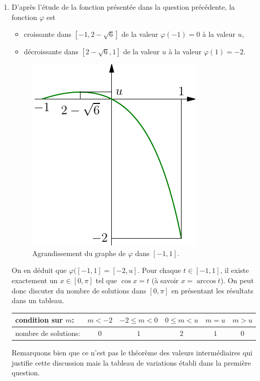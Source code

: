 \begin{enumerate}
  \item D'après l'étude de la fonction présentée dans la question précédente, la fonction $\varphi$ est
\begin{itemize}
  \item croissante dans $[-1,2-\sqrt{6}]$ de la valeur $\varphi(-1)=0$ à la valeur $u$,
  \item décroissante dans $[2-\sqrt{6},1]$ de la valeur $u$ à la valeur $\varphi(1)=-2$. 
\end{itemize}
\begin{figure}[h]
  \centering
  \includegraphics{./Celem16_2.pdf}
  \caption{Agrandissement du graphe de $\varphi$ dans $[-1,1]$.}
  \label{fig: Celem16_2}
\end{figure}
On en déduit que $\varphi([-1,1]= \left[-2,u \right]$.\newline
Pour chaque $t\in [-1,1]$, il existe exactement un $x\in[0,\pi]$ tel que $\cos x = t$ (à savoir $x=\arccos t$). On peut donc discuter du nombre de solutions dans $[0,\pi]$ en présentant les résultats dans un tableau.\bigskip
\begin{center}\renewcommand{\arraystretch}{1.3}
\begin{tabular}{|l|c|c|c|c|c|} \hline
  condition sur $m$:  & $m < -2$ & $-2 \leq m < 0$ & $0 \leq m < u$ & $m = u$ & $m > u$\\ \hline
  nombre de solutions:& $0$      & $1$             & $2$            & $1$     & $0$     \\ \hline
\end{tabular}
\end{center}
Remarquons bien que ce n'est pas le théorème des valeurs intermédiaires qui justifie cette discussion mais la tableau de variations établi dans la première question.

\end{enumerate}

